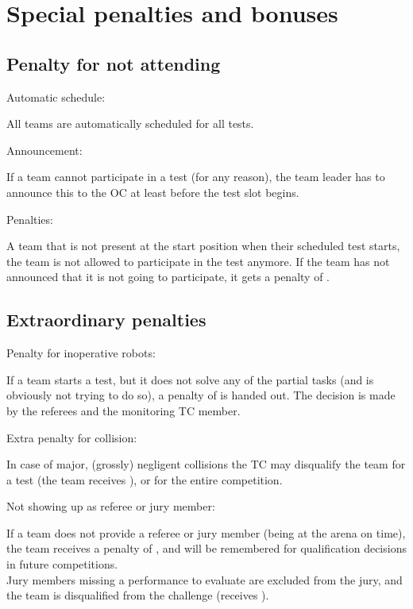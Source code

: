 \section{Special penalties and bonuses}\label{sec:special_awards}


\subsection{Penalty for not attending}\label{rule:not_attending}
\begin{enumerate}
{\bf\item Automatic schedule:} All teams are automatically scheduled for all tests.
{\bf\item Announcement:} If a team cannot participate in a test (for any reason),
the team leader has to announce this to the OC at least  before the test slot begins.
{\bf\item Penalties:} A team that is not present at the start position when their scheduled test starts, 
the team is not allowed to participate in the test anymore. 
If the team has not announced that it is not going to participate, it gets a penalty of . 
\end{enumerate}

\subsection{Extraordinary penalties}\label{rule:extraordinary_penalties}
\begin{enumerate}
{\bf\item Penalty for inoperative robots:} If a team starts a test, but it does not solve any of the partial tasks
(and is obviously not trying to do so), a penalty of  is handed out. 
The decision is made by the referees and the monitoring TC member.  
{\bf\item Extra penalty for collision:} In case of major, (grossly) negligent collisions the TC may disqualify the team for 
a test (the team receives ), or for the entire competition.
{\bf\item Not showing up as referee or jury member:}
If a team does not provide a referee or jury member (being at the arena on time), the team receives a penalty
of , and will be remembered for qualification decisions in future competitions.\\
Jury members missing a performance to evaluate are excluded from the jury, and the team is 
disqualified from the challenge (receives ).
\end{enumerate}

